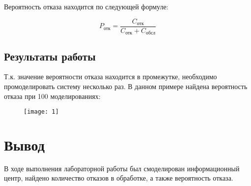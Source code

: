 \documentclass[a4paper,fontsize=12bp]{extreport}
\begin{document}
Вероятность отказа находится по следующей формуле:

$$P_\text{отк} = \frac{C_\text{отк}}{C_\text{отк}+C_\text{обсл}}$$

\subsection*{Результаты работы}

Т.к. значение вероятности отказа находится в промежутке, необходимо промоделировать систему несколько раз. В данном примере найдена вероятность отказа при 100 моделированиях:

\begin{figure}[H]
    \texttt{[image: 1]}
\end{figure}


\section*{Вывод}
В ходе выполнения лабораторной работы был смоделирован информационный центр, найдено количество отказов в обработке, а также вероятность отказа.
\end{document}
